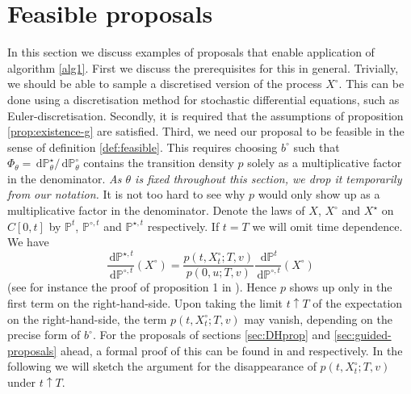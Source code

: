 \documentclass[preprint]{imsart}
\renewcommand{\th}{\theta}
\newcommand{\PP}{\mathbb{P}}
\theoremstyle{definition}
\newcommand{\dd}{{\,\mathrm d}}
\begin{document}

\section{Feasible proposals}\label{sec:proposals}

In this section we discuss examples of proposals that enable application of algorithm \ref{alg1}. First we discuss the prerequisites for this in general.   Trivially, we should be able to sample a discretised version of the process $X^\circ$. This can  be done using a discretisation method for stochastic differential equations, such as Euler-discretisation. Secondly, it is required that the assumptions of proposition  \ref{prop:existence-g} are satisfied.  
Third, we need our proposal to be feasible in the sense of definition \ref{def:feasible}. This requires choosing $b^\circ$ such that $\Phi_\th = \dd \mathbb{P}_\th^\star/\dd \mathbb{P}_\th^\circ$   contains the transition density $p$ solely as a multiplicative factor in the denominator. {\it As $\th$ is fixed throughout this section, we drop it temporarily from our notation.} It is not too hard to see why $p$ would only show up  as a multiplicative factor in the denominator. Denote the laws of $X$, $X^\circ$ and $X^\star$ on $C[0,t]$ by $\PP^t$, $\PP^{\circ,t}$ and $\PP^{\star,t}$ respectively. If $t=T$ we will omit  time dependence. We have 
\[ \frac{\dd \PP^{\star,t}}{\dd \PP^{\circ,t}}(X^\circ) = \frac{p(t,X^\circ_t; T,v)}{p(0,u; T,v)} \frac{\dd \PP^{t}}{\dd \PP^{\circ,t}}(X^\circ) \]
(see for instance the proof of proposition 1 in \cite{Schauer}). Hence $p$ shows up only in the first term on the right-hand-side. Upon taking the limit $t\uparrow T$ of the expectation on the right-hand-side, the term $p(t,X^\circ_t; T,v)$ may vanish, depending on the precise form of $b^\circ$. For the proposals of sections \ref{sec:DHprop} and \ref{sec:guided-proposals} ahead, a formal proof of this can be found in \cite{DelyonHu} and \cite{Schauer}  respectively. In the following we will  sketch the argument for the disappearance of $p(t,X^\circ_t; T,v)$ under $t\uparrow T$. 


\end{document}
